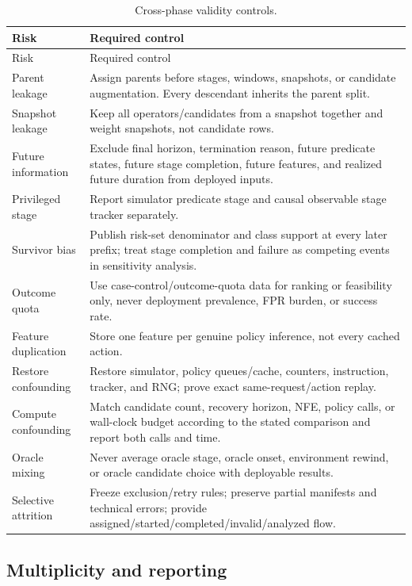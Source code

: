 \begin{longtable}{P{0.24\textwidth}P{0.68\textwidth}}
\caption{Cross-phase validity controls.}\label{tab:validity-controls}\\
\toprule
Risk & Required control \\
\midrule
\endfirsthead
\toprule
Risk & Required control \\
\midrule
\endhead
Parent leakage & Assign parents before stages, windows, snapshots, or candidate augmentation. Every descendant inherits the parent split. \\
Snapshot leakage & Keep all operators/candidates from a snapshot together and weight snapshots, not candidate rows. \\
Future information & Exclude final horizon, termination reason, future predicate states, future stage completion, future features, and realized future duration from deployed inputs. \\
Privileged stage & Report simulator predicate stage and causal observable stage tracker separately. \\
Survivor bias & Publish risk-set denominator and class support at every later prefix; treat stage completion and failure as competing events in sensitivity analysis. \\
Outcome quota & Use case-control/outcome-quota data for ranking or feasibility only, never deployment prevalence, FPR burden, or success rate. \\
Feature duplication & Store one feature per genuine policy inference, not every cached action. \\
Restore confounding & Restore simulator, policy queues/cache, counters, instruction, tracker, and RNG; prove exact same-request/action replay. \\
Compute confounding & Match candidate count, recovery horizon, NFE, policy calls, or wall-clock budget according to the stated comparison and report both calls and time. \\
Oracle mixing & Never average oracle stage, oracle onset, environment rewind, or oracle candidate choice with deployable results. \\
Selective attrition & Freeze exclusion/retry rules; preserve partial manifests and technical errors; provide assigned/started/completed/invalid/analyzed flow. \\
\bottomrule
\end{longtable}

\subsection{Multiplicity and reporting}

